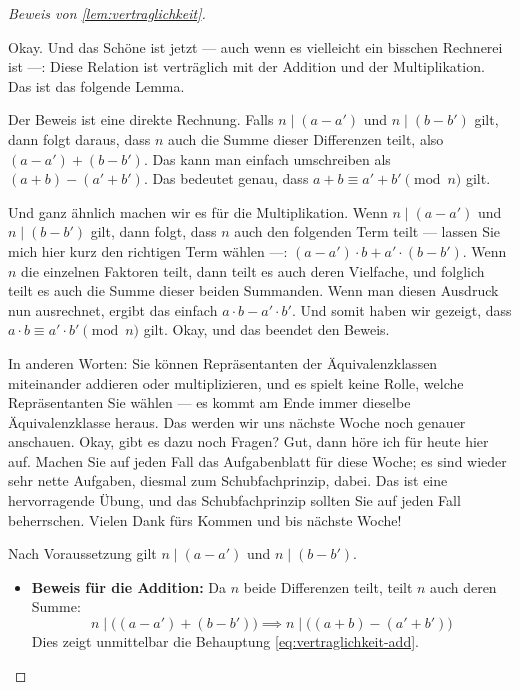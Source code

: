 \begin{proof}[Beweis von \cref{lem:vertraglichkeit}]
\begin{spoken-clean}[01:20:46 - 01:21:27]
Okay. Und das Schöne ist jetzt --- auch wenn es vielleicht ein bisschen Rechnerei ist ---: Diese Relation ist verträglich mit der Addition und der Multiplikation. Das ist das folgende Lemma.

Der Beweis ist eine direkte Rechnung. Falls $n \mid (a - a')$ und $n \mid (b - b')$ gilt, dann folgt daraus, dass $n$ auch die Summe dieser Differenzen teilt, also $(a - a') + (b - b')$. Das kann man einfach umschreiben als $(a + b) - (a' + b')$. Das bedeutet genau, dass $a + b \equiv a' + b' \pmod n$ gilt.

Und ganz ähnlich machen wir es für die Multiplikation. Wenn $n \mid (a - a')$ und $n \mid (b - b')$ gilt, dann folgt, dass $n$ auch den folgenden Term teilt --- lassen Sie mich hier kurz den richtigen Term wählen ---: $(a - a') \cdot b + a' \cdot (b - b')$. Wenn $n$ die einzelnen Faktoren teilt, dann teilt es auch deren Vielfache, und folglich teilt es auch die Summe dieser beiden Summanden. Wenn man diesen Ausdruck nun ausrechnet, ergibt das einfach $a \cdot b - a' \cdot b'$. Und somit haben wir gezeigt, dass $a \cdot b \equiv a' \cdot b' \pmod n$ gilt. Okay, und das beendet den Beweis.

In anderen Worten: Sie können Repräsentanten der Äquivalenzklassen miteinander addieren oder multiplizieren, und es spielt keine Rolle, welche Repräsentanten Sie wählen --- es kommt am Ende immer dieselbe Äquivalenzklasse heraus. Das werden wir uns nächste Woche noch genauer anschauen. Okay, gibt es dazu noch Fragen? Gut, dann höre ich für heute hier auf. Machen Sie auf jeden Fall das Aufgabenblatt für diese Woche; es sind wieder sehr nette Aufgaben, diesmal zum Schubfachprinzip, dabei. Das ist eine hervorragende Übung, und das Schubfachprinzip sollten Sie auf jeden Fall beherrschen. Vielen Dank fürs Kommen und bis nächste Woche!
\end{spoken-clean}

\begin{math-stroke}
Nach Voraussetzung gilt $n \mid (a - a')$ und $n \mid (b - b')$.
\begin{itemize}
    \item \textbf{Beweis für die Addition:}
    Da $n$ beide Differenzen teilt, teilt $n$ auch deren Summe:
    \[ n \mid \bigl( (a - a') + (b - b') \bigr) \implies n \mid \bigl( (a + b) - (a' + b') \bigr) \]
    Dies zeigt unmittelbar die Behauptung \eqref{eq:vertraglichkeit-add}.
    

\end{itemize}
\end{math-stroke}
\end{proof}
